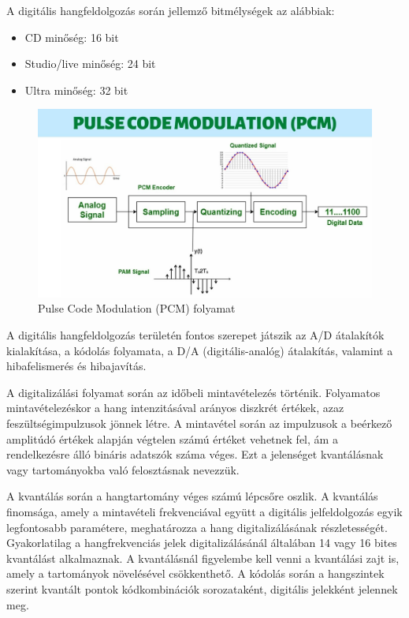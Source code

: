 A digitális hangfeldolgozás során jellemző bitmélységek az alábbiak:
\begin{itemize}
    \item CD minőség: 16 bit
    \item Studio/live minőség: 24 bit
    \item Ultra minőség: 32 bit
\end{itemize}

\begin{figure}[H]
	\centering
	\includegraphics[width=\linewidth, keepaspectratio]{figures/pulse _code_modulation.jpg}
	\caption{Pulse Code Modulation (PCM) folyamat \cite{PULSECODEMODULATION}}
    \label{fig:pcm}
\end{figure}

A digitális hangfeldolgozás területén fontos szerepet játszik az A/D átalakítók kialakítása, 
a kódolás folyamata, a D/A (digitális-analóg) átalakítás, valamint a hibafelismerés és hibajavítás.

A digitalizálási folyamat során az időbeli mintavételezés történik. 
Folyamatos mintavételezéskor a hang intenzitásával arányos diszkrét értékek, azaz feszültségimpulzusok jönnek létre. 
A mintavétel során az impulzusok a beérkező amplitúdó értékek alapján végtelen számú értéket vehetnek fel, 
ám a rendelkezésre álló bináris adatszók száma véges. Ezt a jelenséget kvantálásnak vagy tartományokba 
való felosztásnak nevezzük.

A kvantálás során a hangtartomány véges számú lépcsőre oszlik. 
A kvantálás finomsága, amely a mintavételi frekvenciával együtt a digitális jelfeldolgozás 
egyik legfontosabb paramétere, meghatározza a hang digitalizálásának részletességét. Gyakorlatilag a 
hangfrekvenciás jelek digitalizálásánál általában 14 vagy 16 bites kvantálást alkalmaznak. 
A kvantálásnál figyelembe kell venni a kvantálási zajt is, amely a tartományok növelésével csökkenthető.
A kódolás során a hangszintek szerint kvantált pontok kódkombinációk sorozataként, digitális jelekként jelennek meg.


